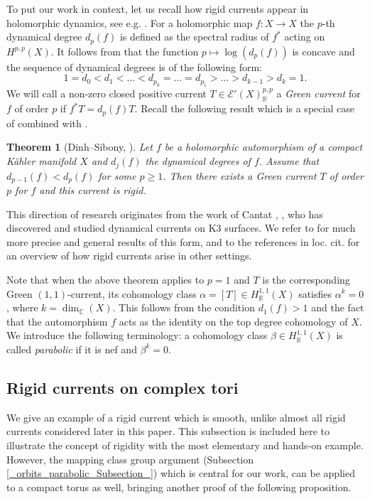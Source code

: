 \documentclass[11pt]{article}
\newcommand{\6}{\partial}
\newcommand{\bbR}{\mathbb{R}}
\newcommand{\bbC}{\mathbb{C}}
\newcommand{\EE}{\mathcal{E}}
\renewcommand{\ge}{\geqslant}
\newtheorem{thm}[defn]{Theorem}
\begin{document}
To put our work in context, let us recall how rigid currents appear in holomorphic dynamics, see e.g. \cite{DS3}.
For a holomorphic map $f\colon X\to X$ the $p$-th dynamical degree $d_p(f)$
is defined as the spectral radius of $f^*$ acting on $H^{p,p}(X)$.
It follows from \cite{Gr} that the function $p\mapsto \log(d_p(f))$ is concave
and the sequence of dynamical degrees is of the following form:
$$
1=d_0 < d_1 <\ldots <d_{p_0} =\ldots = d_{p_1} > \ldots > d_{k-1} > d_k = 1.
$$
We will call a non-zero closed positive current $T\in \EE'(X)^{p,p}_\bbR$ a {\em Green current} for $f$ of order $p$
if $f^*T = d_p(f) T$. Recall the following result which is a special case
of \cite[Theorem 4.2.1]{DS3} combined with \cite[Theorem 4.3.1]{DS3}.
\begin{thm}[Dinh--Sibony, \cite{DS3}]
Let $f$ be a holomorphic automorphism of a compact K\"ahler manifold $X$
and $d_j(f)$ the dynamical degrees of $f$.
Assume that $d_{p-1}(f) < d_p(f)$ for some $p\ge 1$. Then there exists a Green
current $T$ of order $p$ for $f$ and this current is rigid.
\end{thm}
This direction of research originates from the work of Cantat \cite{_Cantat:K3_}, \cite{_Cantat:K3-2_}, who
has discovered and studied dynamical currents on K3 surfaces.
We refer to \cite{DS3} for much more precise and general results of this form,
and to the references in loc. cit. for an overview of how rigid currents arise
in other settings.

Note that when the above theorem applies to $p=1$ and $T$ is the corresponding
Green $(1,1)$-current, its cohomology
class $\alpha = [T]\in H^{1,1}_\bbR(X)$ satisfies $\alpha^k = 0$, where $k = \dim_\bbC (X)$.
This follows from the condition $d_1(f) > 1$ and the fact that the automorphism $f$ acts as the identity
on the top degree cohomology of $X$. We introduce the following terminology:
a cohomology class $\beta\in H^{1,1}_\bbR(X)$ is called {\it parabolic} if
it is nef and $\beta^k = 0$.

\subsection{Rigid currents on complex tori}

We give an example of a rigid current which is
smooth, unlike almost all rigid currents considered later in
this paper. This subsection is included here to illustrate the
concept of rigidity with the most elementary and hands-on example.
However, the mapping class group argument (Subsection
\ref{_orbits_parabolic_Subsection_}) which is
central for our work,  can be applied to a compact
torus as well, bringing another proof of the following
proposition. 
\end{document}
